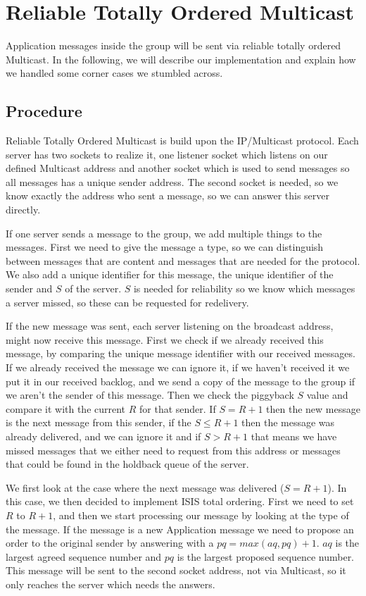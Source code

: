 \documentclass[runningheads]{llncs}
\begin{document}
\section{Reliable Totally Ordered Multicast} \label{multicast}

Application messages inside the group will be sent via reliable totally ordered
Multicast. In the following, we will describe our implementation and explain
how we handled some corner cases we stumbled across.

\subsection{Procedure} \label{multicastprocedure}

Reliable Totally Ordered Multicast is build upon the IP/Multicast protocol.
Each server has two sockets to realize it, one listener socket which listens on
our defined Multicast address and another socket which is used to send messages
so all messages has a unique sender address. The second socket is needed, so we
know exactly the address who sent a message, so we can answer this server
directly.

If one server sends a message to the group, we add multiple things to the
messages. First we need to give the message a type, so we can distinguish
between messages that are content and messages that are needed for the
protocol. We also add a unique identifier for this message, the unique
identifier of the sender and $S$ of the server. $S$ is needed for reliability
so we know which messages a server missed, so these can be requested for
redelivery.

If the new message was sent, each server listening on the broadcast address,
might now receive this message. First we check if we already received this
message, by comparing the unique message identifier with our received messages.
If we already received the message we can ignore it, if we haven't received it
we put it in our received backlog, and we send a copy of the message to the
group if we aren't the sender of this message. Then we check the piggyback $S$
value and compare it with the current $R$ for that sender. If $S = R + 1$ then
the new message is the next message from this sender, if the $S \leq R + 1$
then the message was already delivered, and we can ignore it and if $S > R + 1$
that means we have missed messages that we either need to request from this
address or messages that could be found in the holdback queue of the server.

We first look at the case where the next message was delivered ($S = R + 1$).
In this case, we then decided to implement ISIS total ordering.
First we need to set $R$ to $R + 1$, and then we start processing our message
by looking at the type of the message. If the message is a new Application
message we need to propose an order to the original sender by answering with a
$pq = max(aq, pq) + 1$. $aq$ is the largest agreed sequence number and $pq$ is
the largest proposed sequence number. This message will be sent to the second
socket address, not via Multicast, so it only reaches the server which needs
the answers.
\end{document}
